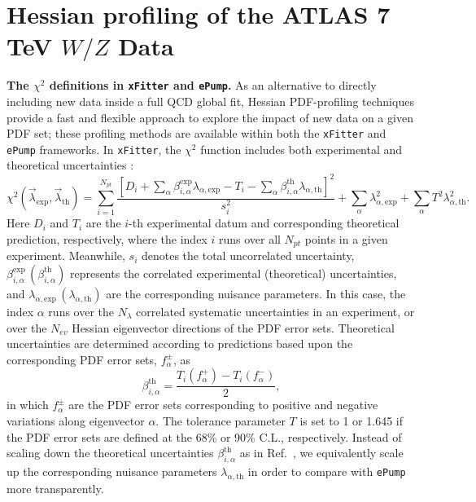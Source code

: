 %
%
\section{Hessian profiling of the ATLAS 7 TeV $W/Z$ Data}
\label{sec:Appendix4xFitter}


{\bf The $\chi^{2}$ definitions in \texttt{xFitter} and \texttt{ePump}.}
%
As an alternative to directly including new data inside a full QCD global fit, Hessian PDF-profiling techniques provide a fast and flexible approach to explore the
impact of new data on a given PDF set; these profiling methods are available within both the \texttt{xFitter} and \texttt{ePump} frameworks.
In \texttt{xFitter}, the $\chi^{2}$ function includes both experimental and theoretical uncertainties \cite{Paukkunen:2014zia,Camarda:2015zba,xFmanual}:	
%
\begin{equation}\label{eq:chi2xfitter}
\chi^{2}(\vec{\lambda}_{\textrm{exp}},\vec{\lambda}_{\textrm{th}})=
\sum_{i=1}^{N_{pt}}\frac{\left[D_{i}+\sum_{\alpha}\beta^{\textrm{exp}}_{i,\alpha}\lambda_{\alpha,\textrm{exp}}-
T_i-\sum_{\alpha}\beta_{i,\alpha}^{\textrm{th}}\lambda_{\alpha,\textrm{th}}
\right]^{2}}{s_{i}^{2}}+\sum_{\alpha}\lambda_{\alpha,\textrm{exp}}^{2}+\sum_{\alpha}T^2\lambda_{\alpha,\textrm{th}}^{2}.
\end{equation}
%
Here $D_{i}$ and $T_i$ are the $i$-th experimental datum and corresponding theoretical prediction, respectively, where the index $i$ runs over all $N_\mathit{pt}$ points in a given experiment. 
%
Meanwhile, $s_{i}$ denotes the total uncorrelated uncertainty, $\beta_{i,\alpha}^{\textrm{exp}}\, (\beta_{i,\alpha}^{\textrm{th}})$ represents the correlated experimental (theoretical) uncertainties,
and $\lambda_{\alpha,\textrm{exp}}\, (\lambda_{\alpha,\textrm{th}})$ are the corresponding nuisance parameters. In this case, the index $\alpha$ runs over the $N_\lambda$ correlated systematic
uncertainties in an experiment, or over the $N_\mathit{ev}$ Hessian eigenvector directions of the PDF error sets. Theoretical uncertainties are determined according to predictions
based upon the corresponding PDF error sets, $f_\alpha^\pm$, as
%
\begin{equation}
\beta_{i,\alpha}^{\textrm{th}}=\frac{T_i(f_{\alpha}^{+})-T_i(f_{\alpha}^{-})}{2},
\end{equation}
%
in which $f_{\alpha}^{\pm}$ are the PDF error sets corresponding to positive and negative variations along eigenvector $\alpha$. The tolerance parameter $T$ is set to 1 or 1.645 if the PDF error sets are defined at the 68\% or 90\% C.L., respectively. Instead of scaling down the theoretical uncertainties $\beta^{\textrm{th}}_{i,\alpha}$ as in Ref.~\cite{xFmanual}, we equivalently scale up the corresponding nuisance parameters $\lambda_{\alpha,\textrm{th}}$ in order to compare with \texttt{ePump} \cite{Schmidt:2018hvu,Hou:2019gfw} more transparently.

